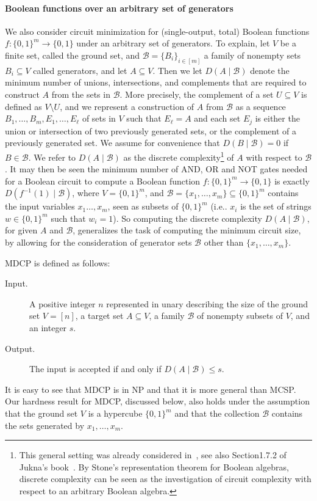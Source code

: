 \paragraph{Boolean functions over an arbitrary set of generators}
We also consider circuit minimization for (single-output, total) Boolean functions $f:\{0,1\}^m\to\{0,1\}$ under an arbitrary set of generators.
To explain, let $V$ be a finite set, called the ground set, and $\mathcal B=\{B_i\}_{i\in[m]}$ a family of nonempty sets $B_i\subseteq V$ called generators, and let $A\subseteq V$. Then we let $D(A\mid\mathcal B)$ denote the minimum number of unions, intersections, and complements that are required to construct $A$ from the sets in $\mathcal B$. More precisely, the complement of a set $U\subseteq V$ is defined as $V\setminus U$, and we represent a construction of $A$ from $\mathcal B$ as a sequence $B_1,\ldots,B_m,E_1,\ldots,E_\ell$ of sets in $V$ such that $E_\ell=A$ and each set $E_j$ is either the union or intersection of two previously generated sets, or the complement of a previously generated set. We assume for convenience that $D(B\mid\mathcal B)=0$ if $B\in\mathcal B$. We refer to $D(A\mid\mathcal B)$ as the discrete complexity\footnote{This general setting was already considered in~\cite{ref68}, see also Section1.7.2 of Jukna's book~\cite{ref42}. By Stone's representation theorem for Boolean algebras, discrete complexity can be seen as the investigation of circuit complexity with respect to an arbitrary Boolean algebra.} of $A$ with respect to $\mathcal B$.
It may then be seen the minimum number of AND, OR and NOT gates needed for a Boolean circuit to compute a Boolean function $f:\{0,1\}^m\to\{0,1\}$ is exactly $D(f^{-1}(1)\mid\mathcal B)$, where $V=\{0,1\}^m$, and $\mathcal B=\{x_1,\ldots,x_m\}\subseteq\{0,1\}^m$ contains the input variables $x_1\ldots,x_m$, seen as subsets of $\{0,1\}^m$ (i.e.. $x_i$ is the set of strings $w\in\{0,1\}^m$ such that $w_i=1$). So computing the discrete complexity $D(A\mid\mathcal B)$, for given $A$ and $\mathcal B$, generalizes the task of computing the minimum circuit size, by allowing for the consideration of generator sets $\mathcal B$ other than $\{x_1,\ldots,x_m\}$.
\setcounter{nttheorem}{2}
\begin{ntdefinition}
MDCP is defined as follows:
\begin{description}
\item[Input.] A positive integer $n$ represented in unary describing the size of the ground set $V=[n]$, a target set $A\subseteq V$, a family $\mathcal B$ of nonempty subsets of $V$, and an integer $s$.
\item[Output.] The input is accepted if and only if $D(A\mid\mathcal B)\leq s$.
\end{description}
\end{ntdefinition}
It is easy to see that MDCP is in NP and that it is more general than MCSP. Our hardness result for MDCP, discussed below, also holds under the assumption that the ground set $V$ is a hypercube $\{0,1\}^m$ and that the collection $\mathcal B$ contains the sets generated by $x_1,\ldots,x_m$.
